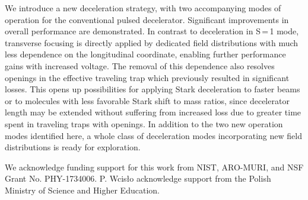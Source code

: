 \documentclass[%
 reprint,
 amsmath,amssymb,
 aps,
prl,
]{revtex4-1}
\begin{document}
We introduce a new deceleration strategy, with two accompanying modes of operation for the conventional pulsed decelerator. 
Significant improvements in overall performance are demonstrated.
In contrast to deceleration in S\,=\,1 mode, transverse focusing is directly applied by dedicated field distributions with much less dependence on the longitudinal coordinate, enabling further performance gains with increased voltage.
The removal of this dependence also resolves openings in the effective traveling trap which previously resulted in significant losses.
This opens up possibilities for applying Stark deceleration to faster beams or to molecules with less favorable Stark shift to mass ratios, since decelerator length may be extended without suffering from increased loss due to greater time spent in traveling traps with openings.
In addition to the two new operation modes identified here, a whole class of deceleration modes incorporating new field distributions is ready for exploration.

We acknowledge funding support for this work from NIST, ARO-MURI, and NSF Grant No. PHY-1734006. P. Wcis\l o acknowledge support from the Polish Ministry of Science and Higher Education. 





\end{document}
